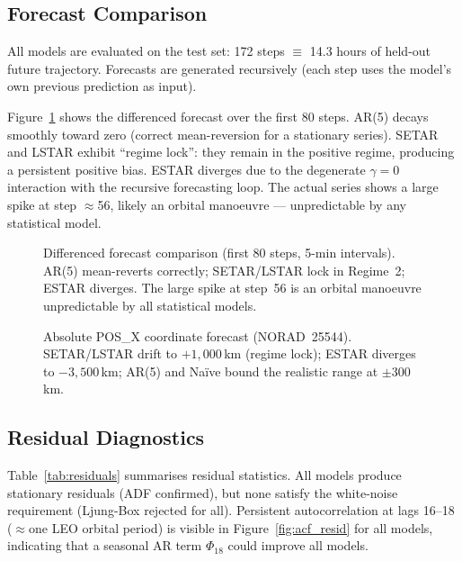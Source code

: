 \documentclass[conference]{IEEEtran}
\begin{document}
\subsection{Forecast Comparison}

All models are evaluated on the test set: 172 steps $\equiv$ 14.3 hours of
held-out future trajectory. Forecasts are generated recursively (each step
uses the model's own previous prediction as input).

Figure~\ref{fig:forecast} shows the differenced forecast over the first 80
steps. AR(5) decays smoothly toward zero (correct mean-reversion for a
stationary series). SETAR and LSTAR exhibit ``regime lock'': they remain
in the positive regime, producing a persistent positive bias. ESTAR diverges
due to the degenerate $\gamma=0$ interaction with the recursive forecasting
loop. The actual series shows a large spike at step $\approx$56, likely an
orbital manoeuvre --- unpredictable by any statistical model.

\begin{figure}[H]
  \centering
  \fbox{\rule{0pt}{3.5cm}\rule{\linewidth}{0pt}}
  \caption{Differenced forecast comparison (first 80 steps, 5-min intervals).
           AR(5) mean-reverts correctly; SETAR/LSTAR lock in Regime~2; ESTAR
           diverges. The large spike at step~56 is an orbital manoeuvre
           unpredictable by all statistical models.}
  \label{fig:forecast}
\end{figure}

\begin{figure}[H]
  \centering
  \fbox{\rule{0pt}{3.5cm}\rule{\linewidth}{0pt}}
  \caption{Absolute POS\_X coordinate forecast (NORAD~25544). SETAR/LSTAR
           drift to $+1{,}000$\,km (regime lock); ESTAR diverges to
           $-3{,}500$\,km; AR(5) and Naïve bound the realistic range at
           $\pm$300\,km.}
  \label{fig:abs_forecast}
\end{figure}

\subsection{Residual Diagnostics}

Table~\ref{tab:residuals} summarises residual statistics. All models produce
stationary residuals (ADF confirmed), but none satisfy the white-noise
requirement (Ljung-Box rejected for all). Persistent autocorrelation at
lags 16--18 ($\approx$one LEO orbital period) is visible in
Figure~\ref{fig:acf_resid} for all models, indicating that a seasonal
AR term $\Phi_{18}$ could improve all models.
\end{document}
